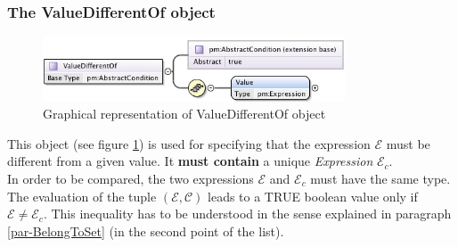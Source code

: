 \documentclass[a4paper,11pt] {ivoa}
\newcommand{\tocheck}[1]{{\color{red} #1}}
\begin{document}
\subsubsection{\tocheck{The ValueDifferentOf object}}
\begin{figure}[htbp]
\begin{center}
\includegraphics[width=0.8\textwidth]{pictures/ValueDifferentOf.jpg} 
\caption{Graphical representation of ValueDifferentOf object}
\label{Pic-ValueDifferentOf}
\end{center}
\end{figure}
This object (see figure \ref{Pic-ValueDifferentOf}) is used for specifying that the expression
$\mathcal E$ must be different from a given value.
It {\bf must contain} a unique {\it Expression} $\mathcal E_c$.\\
In order to be compared, the two expressions $\mathcal E$ and $\mathcal E_c$ must have the same
type.
The evaluation of the tuple $(\mathcal E, \mathcal C)$  leads to a TRUE boolean value only if
$\mathcal E \neq \mathcal E_c$. This inequality has to be understood in the sense explained in
paragraph \ref{par-BelongToSet} (in the second point of the list).
\end{document}
